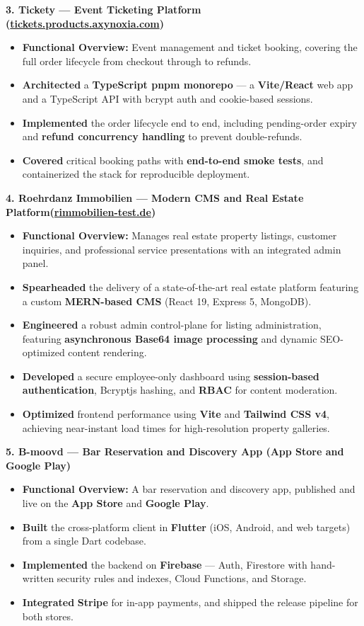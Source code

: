 \documentclass[10pt, letterpaper]{article}
\newenvironment{highlights}{
\begin{itemize}[leftmargin=12pt, itemsep=2pt]
}{
\end{itemize}
}
\begin{document}
\textbf{3. Tickety --- Event Ticketing Platform (\href{https://tickets.products.axynoxia.com}{tickets.products.axynoxia.com})}
\begin{highlights}
\item \textbf{Functional Overview:} Event management and ticket booking, covering the full order lifecycle from checkout through to refunds.
\item \textbf{Architected} a \textbf{TypeScript pnpm monorepo} --- a \textbf{Vite/React} web app and a TypeScript API with bcrypt auth and cookie-based sessions.
\item \textbf{Implemented} the order lifecycle end to end, including pending-order expiry and \textbf{refund concurrency handling} to prevent double-refunds.
\item \textbf{Covered} critical booking paths with \textbf{end-to-end smoke tests}, and containerized the stack for reproducible deployment.
\end{highlights}

\textbf{4. Roehrdanz Immobilien --- Modern CMS and Real Estate Platform(\href{https://rimmobilien-test.de}{rimmobilien-test.de})}
\begin{highlights}
\item \textbf{Functional Overview:} Manages real estate property listings, customer inquiries, and professional service presentations with an integrated admin panel.
\item \textbf{Spearheaded} the delivery of a state-of-the-art real estate platform featuring a custom \textbf{MERN-based CMS} (React 19, Express 5, MongoDB).
\item \textbf{Engineered} a robust admin control-plane for listing administration, featuring \textbf{asynchronous Base64 image processing} and dynamic SEO-optimized content rendering.
\item \textbf{Developed} a secure employee-only dashboard using \textbf{session-based authentication}, Bcryptjs hashing, and \textbf{RBAC} for content moderation.
\item \textbf{Optimized} frontend performance using \textbf{Vite} and \textbf{Tailwind CSS v4}, achieving near-instant load times for high-resolution property galleries.
\end{highlights}

\textbf{5. B-moovd --- Bar Reservation and Discovery App (App Store and Google Play)}
\begin{highlights}
\item \textbf{Functional Overview:} A bar reservation and discovery app, published and live on the \textbf{App Store} and \textbf{Google Play}.
\item \textbf{Built} the cross-platform client in \textbf{Flutter} (iOS, Android, and web targets) from a single Dart codebase.
\item \textbf{Implemented} the backend on \textbf{Firebase} --- Auth, Firestore with hand-written security rules and indexes, Cloud Functions, and Storage.
\item \textbf{Integrated} \textbf{Stripe} for in-app payments, and shipped the release pipeline for both stores.
\end{highlights}
\end{document}

